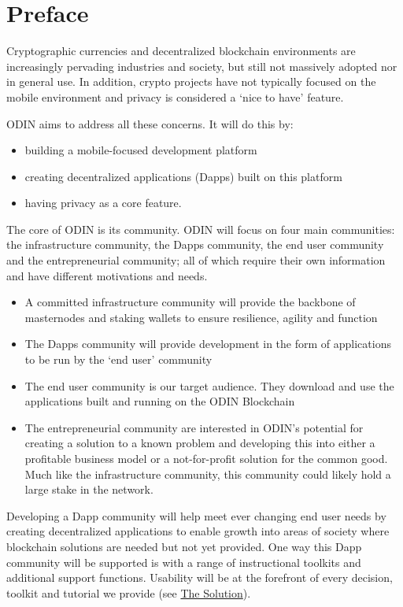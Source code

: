 \section{Preface}
Cryptographic currencies and decentralized blockchain environments are increasingly pervading industries and society, but still not massively adopted nor in general use. In addition, crypto projects have not typically focused on the mobile environment and privacy is considered a `nice to have' feature.

ODIN aims to address all these concerns. It will do this by:
\begin{itemize}
   \item building a mobile-focused development platform 
   \item creating decentralized applications (Dapps) built on this platform
   \item having privacy as a core feature.
\end{itemize}

The core of ODIN is its community. ODIN will focus on four main communities: the infrastructure community, the Dapps community, the end user community and the entrepreneurial community; all of which require their own information and have different motivations and needs.
\begin{itemize}
\item A committed infrastructure community will provide the backbone of masternodes and staking wallets to ensure resilience, agility and function
\item The Dapps community will provide development in the form of applications to be run by the `end user' community
\item The end user community is our target audience. They download and use the applications built and running on the ODIN Blockchain
\item The entrepreneurial community are interested in ODIN's potential for creating a solution to a known problem and developing this into either a profitable business model or a not-for-profit solution for the common good. Much like the infrastructure community, this community could likely hold a large stake in the network.
\end{itemize}

Developing a Dapp community will help meet ever changing end user needs by creating decentralized applications to enable growth into areas of society where blockchain solutions are needed but not yet provided. One way this Dapp community will be supported is with a range of instructional toolkits and additional support functions. Usability will be at the forefront of every decision, toolkit and tutorial we provide (see \hyperlink{solution}{The Solution}).

